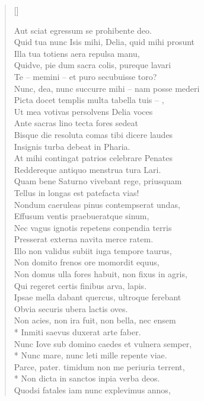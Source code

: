 \begin{verse}[\versewidth]
\begin{altverse}
{Aut sciat egressum se prohibente deo.\\
Quid tua nunc Isis mihi, Delia, quid mihi prosunt\\
Illa tua totiens aera repulsa manu,\\
Quidve, pie dum sacra colis, pureque lavari\\
Te – memini – et puro secubuisse toro?\\
Nunc, dea, nunc succurre mihi – nam posse mederi\\
Picta docet templis multa tabella tuis – ,\\
Ut mea votivas persolvens Delia voces\\
Ante sacras lino tecta fores sedeat\\
Bisque die resoluta comas tibi dicere laudes\\
Insignis turba debeat in Pharia.\\
At mihi contingat patrios celebrare Penates\\
Reddereque antiquo menstrua tura Lari.\\
Quam bene Saturno vivebant rege, priusquam\\
Tellus in longas est patefacta vias!\\
Nondum caeruleas pinus contempserat undas,\\
Effusum ventis praebueratque sinum,\\
Nec vagus ignotis repetens conpendia terris\\
Presserat externa navita merce ratem.\\
Illo non validus subiit iuga tempore taurus,\\
Non domito frenos ore momordit equus,\\
Non domus ulla fores habuit, non fixus in agris,\\
Qui regeret certis finibus arva, lapis.\\
Ipsae mella dabant quercus, ultroque ferebant\\
Obvia securis ubera lactis oves.\\
Non acies, non ira fuit, non bella, nec ensem\\*
Inmiti saevus duxerat arte faber.\\
Nunc Iove sub domino caedes et vulnera semper,\\*
Nunc mare, nunc leti mille repente viae.\\
Parce, pater. timidum non me periuria terrent,\\*
Non dicta in sanctos inpia verba deos.\\
Quodsi fatales iam nunc explevimus annos,\\
}
\end{altverse}
\end{verse}
